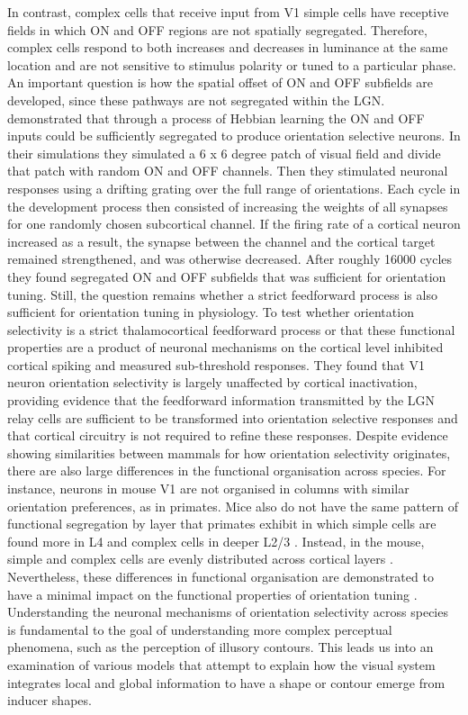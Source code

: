 \documentclass[12pt]{article}
\begin{document}
\bigbreak
In contrast, complex cells that receive input from V1 simple cells have receptive fields in which ON and OFF regions are not spatially segregated. Therefore, complex cells respond to both increases and decreases in luminance at the same location and are not sensitive to stimulus polarity or tuned to a particular phase. An important question is how the spatial offset of ON and OFF subfields are developed, since these pathways are not segregated within the LGN. \textcite{nguyenModelOriginDevelopment2019} demonstrated that through a process of Hebbian learning the ON and OFF inputs could be sufficiently segregated to produce orientation selective neurons. In their simulations they simulated a 6 x 6 degree patch of visual field and divide that patch with random ON and OFF channels. Then they stimulated neuronal responses using a drifting grating over the full range of orientations. Each cycle in the development process then consisted of increasing the weights of all synapses for one randomly chosen subcortical channel. If the firing rate of a cortical neuron increased as a result, the synapse between the channel and the cortical target remained strengthened, and was otherwise decreased. After roughly 16000 cycles they found segregated ON and OFF subfields that was sufficient for orientation tuning. Still, the question remains whether a strict feedforward process is also sufficient for orientation tuning in physiology.
\bigbreak
To test whether orientation selectivity is a strict thalamocortical feedforward process or that these functional properties are a product of neuronal mechanisms on the cortical level \textcite{fersterOrientationSelectivityThalamic1996} inhibited cortical spiking and measured sub-threshold responses. They found that V1 neuron orientation selectivity is largely unaffected by cortical inactivation, providing evidence that the feedforward information transmitted by the LGN relay cells are sufficient to be transformed into orientation selective responses and that cortical circuitry is not required to refine these responses. Despite evidence showing similarities between mammals for how orientation selectivity originates, there are also large differences in the functional organisation across species. For instance, neurons in mouse V1 are not organised in columns with similar orientation preferences, as in primates. Mice also do not have the same pattern of functional segregation by layer that primates exhibit in which simple cells are found more in L4 and complex cells in deeper L2/3 \autocite{martinezReceptiveFieldStructure2005}. Instead, in the mouse, simple and complex cells are evenly distributed across cortical layers \autocite{niellHighlySelectiveReceptive2008}. Nevertheless, these differences in functional organisation are demonstrated to have a minimal impact on the functional properties of orientation tuning \autocite{hooserOrientationSelectivityOrientation2005}. Understanding the neuronal mechanisms of orientation selectivity across species is fundamental to the goal of understanding more complex perceptual phenomena, such as the perception of illusory contours. This leads us into an examination of various models that attempt to explain how the visual system integrates local and global information to have a shape or contour emerge from inducer shapes.    
\end{document}
